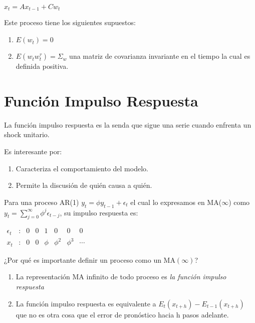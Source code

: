 \documentclass[
]{book}
\providecommand{\tightlist}{%
  \setlength{\itemsep}{0pt}\setlength{\parskip}{0pt}}
\begin{document}
\(x_t = Ax_{t−1} + Cw_t\)

Este proceso tiene los siguientes supuestos:

\begin{enumerate}
\def\labelenumi{\arabic{enumi}.}
\item
  \(E(w_{t})=0\)
\item
  \(E(w_{t}w_{t}^{\tau})=\Sigma_{w}\) una matriz de covarianza invariante en el tiempo la cual es definida positiva.
\end{enumerate}

\hypertarget{funciuxf3n-impulso-respuesta}{%
\section{Función Impulso Respuesta}\label{funciuxf3n-impulso-respuesta}}

La función impulso respuesta es la senda que sigue una serie cuando enfrenta un shock unitario.

Es interesante por:

\begin{enumerate}
\def\labelenumi{\arabic{enumi}.}
\tightlist
\item
  Caracteriza el comportamiento del modelo.
\item
  Permite la discusión de quién causa a quién.
\end{enumerate}

Para una proceso AR(1) \(y_{t}=\phi y_{t-1}+\epsilon_{t}\) el cual lo expresamos en MA(\(\infty\)) como \(y_{t}=\sum_{j=0}^{\infty}\phi^{j} \epsilon_{t-j}\), su impulso respuesta es:

\(\begin{array}{cccccccc} \epsilon_{t} &\colon &0&0&1&0&0&0 \\ x_{t} &\colon &0&0&\phi&\phi^{2}&\phi^{3}&\cdots \end{array}\)

¿Por qué es importante definir un proceso como un MA\((\infty)\)?

\begin{enumerate}
\def\labelenumi{\arabic{enumi}.}
\tightlist
\item
  La representación MA infinito de todo proceso es \emph{la función impulso respuesta}
\item
  La función impulso respuesta es equivalente a \(E_{t}(x_{t+h})-E_{t-1}(x_{t+h})\) que no es otra cosa que el error de pronóstico hacia h pasos adelante.
\end{enumerate}
\end{document}
